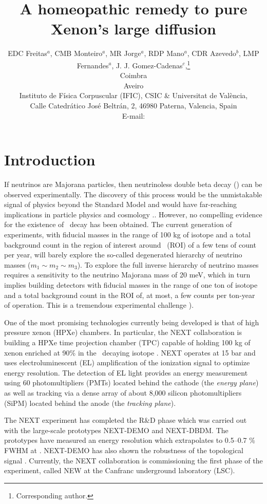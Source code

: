 \documentclass{JINST}
\title{A homeopathic remedy to pure Xenon's large diffusion }
\author{EDC Freitas$^a$, CMB Monteiro$^a$, MR Jorge$^a$, 
RDP Mano$^a$, CDR Azevedo$^b$, LMP Fernandes$^a$, 
J. J. Gomez-Cadenas$^c$,\thanks{Corresponding author.}


\llap{$^a$}Coimbra\\
\llap{$^b$}Aveiro\\
\llap{$^b$}Instituto de F\'isica Corpuscular (IFIC), CSIC \& Universitat de Val\`encia,\\ 
Calle Catedr\'atico Jos\'e Beltr\'an, 2, 46980 Paterna, Valencia, Spain\\

E-mail: \email{gomez@mail.cern.ch}}
\begin{document}
\section{Introduction}
\label{sec.intro}

If neutrinos are Majorana particles, then neutrinoless double beta decay (\bbonu)  can be observed experimentally. The discovery of this process would be the unmistakable signal of physics beyond the Standard Model and would have far-reaching implications in particle physics and cosmology \cite{GomezCadenas:2013ue, Cadenas_2012}.. However,
no compelling evidence for the existence of \bbonu\ decay has been obtained. The current generation of experiments, with fiducial masses in the range of 100 kg of isotope and a total background count in the region of interest around \Qbb\ (ROI) of a few tens of count per year, will barely explore the so-called degenerated hierarchy of neutrino masses ($m_1 \sim m_2 \sim m_3$). To explore the full inverse hierarchy of neutrino masses requires a sensitivity to the neutrino Majorana mass of 20 meV, which in turn implies building detectors with fiducial masses in the range of one ton of isotope and a total background count in the ROI of, at most, a few counts per ton-year of operation. This is a tremendous experimental challenge  \cite{Gomez-Cadenas:2015twa}).


One of the most promising technologies currently being developed is that of high pressure xenon (HPXe) chambers. In particular, the NEXT collaboration \cite{Gomez-Cadenas:2014dxa} is building a HPXe time projection chamber (TPC) capable of holding 100 kg of xenon enriched at 90\% in the \bb\ decaying isotope \XE. NEXT operates at 15 bar and uses electroluminescent (EL) amplification of the ionization signal to optimize energy resolution. The detection of EL light provides an energy measurement using 60 photomultipliers (PMTs) located behind the cathode (the \emph{energy plane}) as well as tracking  via a dense array of about 8,000 silicon photomultipliers (SiPM) located behind the anode (the \emph{tracking plane}).

The NEXT experiment has completed the R\&D phase which was carried out with the large-scale prototypes NEXT-DEMO and NEXT-DBDM. The prototypes have measured an energy resolution which extrapolates to 0.5--0.7 \% FWHM at \Qbb. NEXT-DEMO has also shown the robustness of the topological signal \cite{Alvarez:2012xda,Alvarez:2012kua,Alvarez:2013gxa,Lorca:2014sra}. Currently, the NEXT collaboration is commissioning the first phase of the experiment, called NEW at the Canfranc underground laboratory (LSC). 
\end{document}
